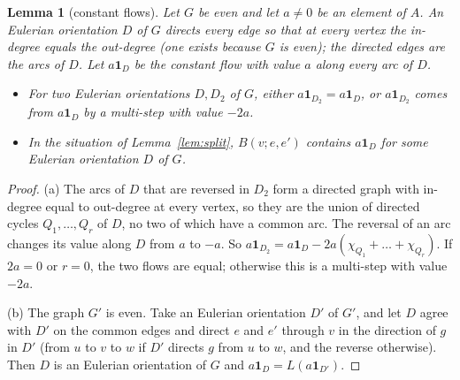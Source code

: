 \documentclass[11pt]{article}
\newtheorem{lemma}[theorem]{Lemma}
\theoremstyle{definition}
\newcommand{\one}{\mathbf{1}}
\begin{document}
\begin{lemma}[constant flows]\label{lem:const}
Let $G$ be even and let $a\ne 0$ be an element of $A$. An Eulerian orientation $D$ of $G$ directs every edge so that at every vertex the
in-degree equals the out-degree (one exists because $G$ is even); the directed edges are the \emph{arcs} of $D$. Let
$a\one_D$ be the constant flow with value $a$ along every arc of $D$.
\begin{itemize}
\item[(a)] For two Eulerian orientations $D,D_2$ of $G$, either $a\one_{D_2}=a\one_D$, or $a\one_{D_2}$ comes from
$a\one_D$ by a multi-step with value $-2a$.
\item[(b)] In the situation of Lemma~\ref{lem:split}, $B(v;e,e')$ contains $a\one_D$ for some Eulerian orientation $D$ of $G$.
\end{itemize}
\end{lemma}
\begin{proof}
(a) The arcs of $D$ that are reversed in $D_2$ form a directed graph with in-degree equal to out-degree at every
vertex, so they are the union of directed cycles $Q_1,\dots,Q_r$ of $D$, no two of which have a common arc. The
reversal of an arc changes its value along $D$ from $a$ to $-a$. So
$a\one_{D_2}=a\one_D-2a(\chi_{Q_1}+\dots+\chi_{Q_r})$. If $2a=0$ or $r=0$, the two flows are equal; otherwise this is a
multi-step with value $-2a$.

(b) The graph $G'$ is even. Take an Eulerian orientation $D'$ of $G'$, and let $D$ agree with $D'$ on the common edges and
direct $e$ and $e'$ through $v$ in the direction of $g$ in $D'$ (from $u$ to $v$ to $w$ if $D'$ directs $g$ from $u$
to $w$, and the reverse otherwise). Then $D$ is an Eulerian orientation of $G$ and $a\one_D=L(a\one_{D'})$.
\end{proof}
\end{document}
